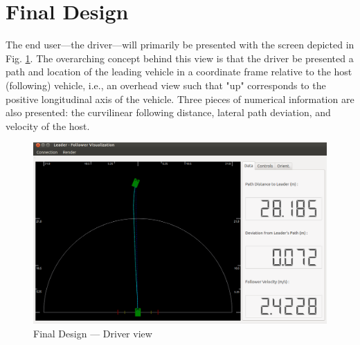 \documentclass[12pt]{report}
\begin{document}
\section{Final Design}
\label{sec:finaldes}

The end user---the driver---will primarily be presented with the screen depicted in Fig. \ref{fig:finaldesdriv}. The overarching concept behind this view is that the driver be presented a path and location of the leading vehicle in a coordinate frame relative to the host (following) vehicle, i.e., an overhead view such that "up" corresponds to the positive longitudinal axis of the vehicle. Three pieces of numerical information are also presented: the curvilinear following distance, lateral path deviation, and velocity of the host. 

\begin{figure}[ht] \centering
    \includegraphics[width=6.5in]{./figs/final_design_data.png}
    \caption{Final Design --- Driver view}
    \label{fig:finaldesdriv}
\end{figure}

\end{document}
